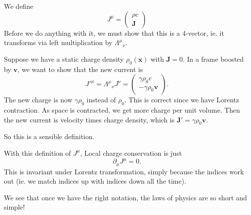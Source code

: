 \documentclass[a4paper]{article}
\begin{document}
We define
\[
  J^\mu =
  \begin{pmatrix}
    \rho c\\
    \mathbf{J}
  \end{pmatrix}
\]
Before we do anything with it, we must show that this is a 4-vector, ie. it transforms via left multiplication by $\Lambda^\mu\!_\nu$.

Suppose we have a static charge density $\rho_0(\mathbf{x})$ with $\mathbf{J} = 0$. In a frame boosted by $\mathbf{v}$, we want to show that the new current is
\[
  J'^\mu = \Lambda^\mu\!_\nu J^\nu =
  \begin{pmatrix}
    \gamma \rho_0 c\\
    -\gamma \rho_0 \mathbf{v}
  \end{pmatrix}.
\]
The new charge is now $\gamma \rho_0$ instead of $\rho_0$. This is correct since we have Lorentz contraction. As space is contracted, we get more charge per unit volume. Then the new current is velocity times charge density, which is $\mathbf{J}' = \gamma\rho_0 \mathbf{v}$.

So this is a sensible definition.

With this definition of $J^\mu$, Local charge conservation is just
\[
  \partial_\mu J^\mu = 0.
\]
This is invariant under Lorentz transformation, simply because the indices work out (ie. we match indices up with indices down all the time).

We see that once we have the right notation, the laws of physics are so short and simple!
\end{document}
